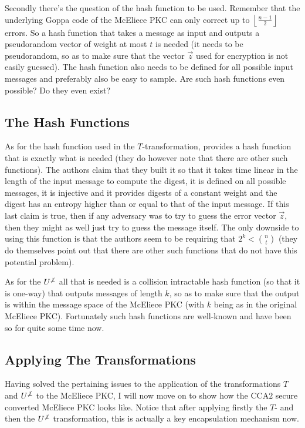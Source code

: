 Secondly there's the question of the hash function to be used. Remember that the underlying Goppa code of the McEliece PKC can only correct up to  $\left\lfloor \frac{n-1}{2} \right\rfloor$ errors. So a hash function that takes a message as input and outputs a pseudorandom vector of weight at most $t$ is needed (it needs to be pseudorandom, so as to make sure that the vector $\vec{z}$ used for encryption is not easily guessed). The hash function also needs to be defined for all possible input messages and preferably also be easy to sample. Are such hash functions even possible? Do they even exist?



\subsection{The Hash Functions}
\label{subsec:TheHashFunctionsInChap5}

As for the hash function used in the $T$-transformation, \cite{BP} provides a hash function that is exactly what is needed (they do however note that there are other such functions). The authors claim that they built it so that it takes time linear in the length of the input message to compute the digest, it is defined on all possible messages, it is injective and it provides digests of a constant weight and the digest has an entropy higher than or equal to that of the input message. If this last claim is true, then if any adversary was to try to guess the error vector $\vec{z}$, then they might as well just try to guess the message itself. The only downside to using this function is that the authors seem to be requiring that $2^k < \binom{n}{t}$ (they do themselves point out that there are other such functions that do not have this potential problem).

As for the $U^{\not\bot}$ all that is needed is a collision intractable hash function (so that it is one-way) that outputs messages of length $k$, so as to make sure that the output is within the message space of the McEliece PKC (with $k$ being as in the original McEliece PKC). Fortunately such hash functions are well-known and have been so for quite some time now.



\subsection{Applying The Transformations}

Having solved the pertaining issues to the application of the transformations $T$ and $U^{\not\bot}$ to the McEliece PKC, I will now move on to show how the $\mathrm{CCA}2$ secure converted McEliece PKC looks like. Notice that after applying firstly the $T$- and then the $U^{\not\bot}$ transformation, this is actually a key encapsulation mechanism now.

